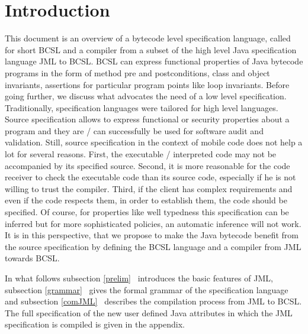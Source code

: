 
\newcommand{\code}{\textit{code}}
\newcommand{\indexComp}{\textit{index}}





\section{Introduction} \label{bcsl}
This document is an overview of a bytecode level specification language, called for short BCSL and a compiler from a
 subset of the high level Java specification language JML to BCSL. 
 BCSL can express functional properties of Java bytecode programs in the form of method pre and postconditions, class and object 
invariants, assertions for particular program points like loop invariants.  Before going further, we discuss what advocates the need of a low level specification.
Traditionally, specification languages were tailored for high level languages. 
Source  specification allows to express functional or security properties about a program and they are / can successfully be used 
for software audit and validation. Still, source specification in the context of mobile code does not help a lot for several reasons.
First, the executable / interpreted code  may not be accompanied by its specified  source. Second, it is more reasonable for the 
code receiver to check the executable code than its source code, especially if he is not willing to trust the compiler. 
Third, if the client has complex requirements and even if the code respects them, in order to establish them, 
the code should be specified. Of course, for properties like well typedness this specification can be inferred  
but  for more sophisticated policies, an automatic inference will not work. It is in this perspective, that we propose to make the Java
bytecode benefit from the source specification by defining the BCSL language and a compiler from JML towards BCSL.    

In what follows subsection \ref{prelim} \ introduces the basic features of JML, subsection \ref{grammar} \ gives the formal grammar
 of the specification language and subsection 
 \ref{comJML} \ describes the compilation process from JML to BCSL.
  The full specification of the new user defined Java attributes in which the JML specification is compiled is given in the appendix.







